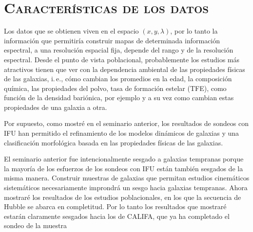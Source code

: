 \documentclass{article}
\begin{document}
\section{\textsc{Características de los datos}}
%
Los datos que se obtienen viven en el espacio $(x,y,\lambda)$, por lo tanto la información que
permitiría construir mapas de determinada información espectral, a una resolución espacial fija,
depende del rango y de la resolución espectral. Desde el punto de vista poblacional, probablemente
los estudios más atractivos tienen que ver con la dependencia ambiental de las propiedades físicas
de las galaxias, i.\,e., cómo cambian los promedios en la edad, la composición química, las
propiedades del polvo, tasa de formación estelar (TFE), como función de la densidad bariónica, por
ejemplo y a su vez como cambian estas propiedades de una galaxia a otra.

Por supuesto, como mostré en el seminario anterior, los resultados de sondeos con IFU han permitido
el refinamiento de los modelos dinámicos de galaxias y una clasificación morfológica basada en las
propiedades físicas de las galaxias.

El seminario anterior fue intencionalmente sesgado a galaxias tempranas porque la mayoría de los
esfuerzos de los sondeos con IFU están también sesgados de la misma manera. Construir muestras de
galaxias que permitan estudios cinemáticos sistemáticos necesariamente improndrá un sesgo hacia
galaxias tempranas. Ahora mostraré los resultados de los estudios poblacionales, en los que la
secuencia de Hubble se abarca en completitud. Por lo tanto los resultados que mostraré estarán
claramente sesgados hacia los de CALIFA, que ya ha completado el sondeo de la muestra

\printbibliography
\end{document}
